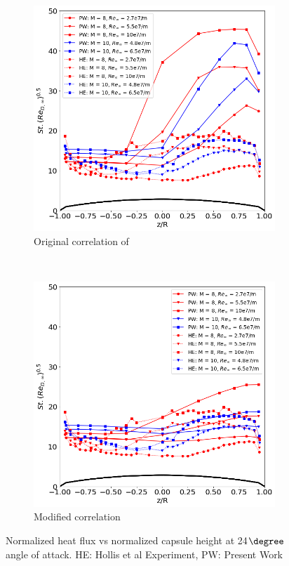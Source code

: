 \documentclass[%
 aip,
 amsmath,amssymb,
preprint,%
]{revtex4-1}
\begin{document}
\begin{figure}[h!]
\centering
\begin{subfigure}[b]{0.49\textwidth}
\centering
\includegraphics[width=\textwidth]{St-24-hollis.png}
\caption{Original correlation of \cite{hollis_aeroheating_2009}}
\label{St-24-hollis}
\end{subfigure}
~
\begin{subfigure}[b]{0.49\textwidth}
\centering
\includegraphics[width=\textwidth]{St-24-hollis-new.png}
\caption{Modified correlation}
\label{St-24-hollis-new}
\end{subfigure}
\caption{Normalized heat flux vs normalized capsule height at 24$\degree$ angle of attack. HE: Hollis et al Experiment, PW: Present Work}
\end{figure}
\end{document}
